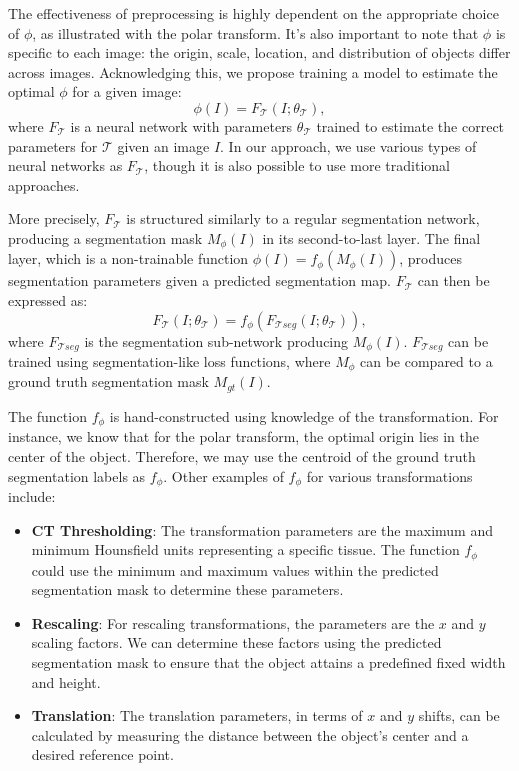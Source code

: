 The effectiveness of preprocessing is highly dependent on the appropriate choice of \(\phi\), as illustrated with the polar transform. It's also important to note that \(\phi\) is specific to each image: the origin, scale, location, and distribution of objects differ across images. Acknowledging this, we propose training a model to estimate the optimal \(\phi\) for a given image:
\begin{equation}
	\phi(I) = F_{\mathcal{T}}(I; \theta_{\mathcal{T}}),
\end{equation}
where $F_{\mathcal{T}}$ is a neural network with parameters $\theta_{\mathcal{T}}$ trained to estimate the correct parameters for $\mathcal{T}$ given an image $I$. In our approach, we use various types of neural networks as $F_{\mathcal{T}}$, though it is also possible to use more traditional approaches.

More precisely, $F_{\mathcal{T}}$ is structured similarly to a regular segmentation network, producing a segmentation mask $M_\phi(I)$ in its second-to-last layer. The final layer, which is a non-trainable function $\phi(I) = f_\phi(M_\phi(I))$, produces segmentation parameters given a predicted segmentation map. $F_{\mathcal{T}}$ can then be expressed as:
\begin{equation}
	F_{\mathcal{T}}(I; \theta_{\mathcal{T}}) = f_\phi(F_{\mathcal{T}seg}(I; \theta_{\mathcal{T}})),
\end{equation}
where $F_{\mathcal{T}seg}$ is the segmentation sub-network producing $M_\phi(I)$. $F_{\mathcal{T}seg}$ can be trained using segmentation-like loss functions, where $M_\phi$ can be compared to a ground truth segmentation mask $M_{gt}(I)$. 

The function $f_\phi$ is hand-constructed using knowledge of the transformation. For instance, we know that for the polar transform, the optimal origin lies in the center of the object. Therefore, we may use the centroid of the ground truth segmentation labels as $f_\phi$. Other examples of \( f_\phi \) for various transformations include:

\begin{itemize}
	\item \textbf{CT Thresholding}: The transformation parameters are the maximum and minimum Hounsfield units representing a specific tissue. The function \( f_\phi \) could use the minimum and maximum values within the predicted segmentation mask to determine these parameters.
	\item \textbf{Rescaling}: For rescaling transformations, the parameters are the \( x \) and \( y \) scaling factors. We can determine these factors using the predicted segmentation mask to ensure that the object attains a predefined fixed width and height.
	\item \textbf{Translation}: The translation parameters, in terms of \( x \) and \( y \) shifts, can be calculated by measuring the distance between the object's center and a desired reference point.
\end{itemize}

